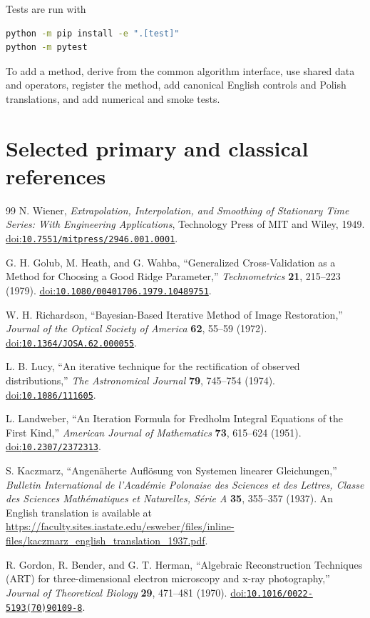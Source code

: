 \documentclass[10pt,a4paper]{article}
\newcommand{\doilink}[1]{\href{https://doi.org/#1}{doi:\nolinkurl{#1}}}
\begin{document}
Tests are run with
\begin{lstlisting}[language=bash]
python -m pip install -e ".[test]"
python -m pytest
\end{lstlisting}
To add a method, derive from the common algorithm interface, use shared data and operators, register the method, add canonical English controls and Polish translations, and add numerical and smoke tests.


\clearpage
\section{Selected primary and classical references}
\begin{thebibliography}{99}
N. Wiener, \emph{Extrapolation, Interpolation, and Smoothing of Stationary Time Series: With Engineering Applications}, Technology Press of MIT and Wiley, 1949. \doilink{10.7551/mitpress/2946.001.0001}.

G. H. Golub, M. Heath, and G. Wahba, ``Generalized Cross-Validation as a Method for Choosing a Good Ridge Parameter,'' \emph{Technometrics} \textbf{21}, 215--223 (1979). \doilink{10.1080/00401706.1979.10489751}.

W. H. Richardson, ``Bayesian-Based Iterative Method of Image Restoration,'' \emph{Journal of the Optical Society of America} \textbf{62}, 55--59 (1972). \doilink{10.1364/JOSA.62.000055}.

L. B. Lucy, ``An iterative technique for the rectification of observed distributions,'' \emph{The Astronomical Journal} \textbf{79}, 745--754 (1974). \doilink{10.1086/111605}.

L. Landweber, ``An Iteration Formula for Fredholm Integral Equations of the First Kind,'' \emph{American Journal of Mathematics} \textbf{73}, 615--624 (1951). \doilink{10.2307/2372313}.

S. Kaczmarz, ``Angen\"aherte Aufl\"osung von Systemen linearer Gleichungen,'' \emph{Bulletin International de l'Acad\'emie Polonaise des Sciences et des Lettres, Classe des Sciences Math\'ematiques et Naturelles, S\'erie A} \textbf{35}, 355--357 (1937). An English translation is available at \url{https://faculty.sites.iastate.edu/esweber/files/inline-files/kaczmarz_english_translation_1937.pdf}.

R. Gordon, R. Bender, and G. T. Herman, ``Algebraic Reconstruction Techniques (ART) for three-dimensional electron microscopy and x-ray photography,'' \emph{Journal of Theoretical Biology} \textbf{29}, 471--481 (1970). \doilink{10.1016/0022-5193(70)90109-8}.


\end{thebibliography}
\end{document}
